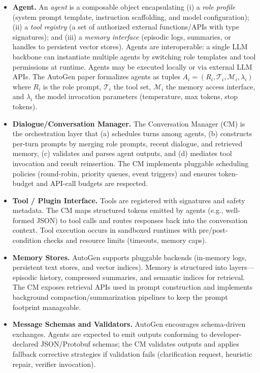\begin{itemize}
  \item \textbf{Agent.} An \emph{agent} is a composable object encapsulating (i) a \emph{role profile} (system prompt template, instruction scaffolding, and model configuration); (ii) a \emph{tool registry} (a set of authorized external functions/APIs with type signatures); and (iii) a \emph{memory interface} (episodic logs, summaries, or handles to persistent vector stores). Agents are interoperable: a single LLM backbone can instantiate multiple agents by switching role templates and tool permissions at runtime. Agents may be executed locally or via external LLM APIs. The AutoGen paper formalizes agents as tuples \(A_i=(R_i,\mathcal{T}_i,\mathcal{M}_i,\lambda_i)\) where \(R_i\) is the role prompt, \(\mathcal{T}_i\) the tool set, \(\mathcal{M}_i\) the memory access interface, and \(\lambda_i\) the model invocation parameters (temperature, max tokens, stop tokens). \cite{autogen_arXiv}
  \item \textbf{Dialogue/Conversation Manager.} The Conversation Manager (CM) is the orchestration layer that (a) schedules turns among agents, (b) constructs per-turn prompts by merging role prompts, recent dialogue, and retrieved memory, (c) validates and parses agent outputs, and (d) mediates tool invocation and result reinsertion. The CM implements pluggable scheduling policies (round-robin, priority queues, event triggers) and ensures token-budget and API-call budgets are respected. \cite{autogen_arXiv, autogen_github}
  \item \textbf{Tool / Plugin Interface.} Tools are registered with signatures and safety metadata. The CM maps structured tokens emitted by agents (e.g., well-formed JSON) to tool calls and routes responses back into the conversation context. Tool execution occurs in sandboxed runtimes with pre/post-condition checks and resource limits (timeouts, memory caps). \cite{autogen_arXiv}
  \item \textbf{Memory Stores.} AutoGen supports pluggable backends (in-memory logs, persistent text stores, and vector indices). Memory is structured into layers—episodic history, compressed summaries, and semantic indices for retrieval. The CM exposes retrieval APIs used in prompt construction and implements background compaction/summarization pipelines to keep the prompt footprint manageable. \cite{autogen_arXiv, autogen_github}
  \item \textbf{Message Schemas and Validators.} AutoGen encourages schema-driven exchanges. Agents are expected to emit outputs conforming to developer-declared JSON/Protobuf schemas; the CM validates outputs and applies fallback corrective strategies if validation fails (clarification request, heuristic repair, verifier invocation). \cite{autogen_arXiv}
\end{itemize}

